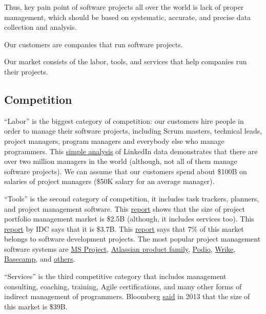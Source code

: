 \documentclass{main}
\begin{document}
Thus, key pain point of software projects all over the world is lack of proper
management, which should be based on systematic, accurate, and precise data
collection and analysis.

Our customers are companies that run software projects.

Our market consists of the labor, tools, and services that help companies run
their projects.

\subsection{Competition}

``Labor'' is the biggest category of competition: our customers hire people  in
order to manage their software projects, including Scrum masters, technical
leads, project managers, program managers and everybody else who manage
programmers. This \href{https://www.binfire.com/blog/2016/06/how-many-project-managers-in-the-world/}{simple analysis}
of LinkedIn data demonstrates that there are
over two million managers in the world (although, not all of them manage
software projects). We can assume that our customers spend about \$100B on
salaries of project managers (\$50K salary for an average manager).

``Tools'' is the second category of competition, it includes task trackers,
pla\-n\-ners, and project management software. This
\href{http://www.marketsandmarkets.com/Market-Reports/project-portfolio-management-software-market-225932595.html}{report}
shows that the size of
project portfolio management market is \$2.5B (although, it includes services
too). This \href{http://www.idc.com/getdoc.jsp?containerId=256779}{report}
by IDC says that it is \$3.7B. This
\href{https://www.capterra.com/project-management-software/user-research/}{report} says that 7\% of this
market belongs to software development projects. The most popular project
management software systems are
\href{https://products.office.com/en-us/project/project-and-portfolio-management-software}{MS Project},
\href{https://www.atlassian.com/software}{Atlassian product family},
\href{https://podio.com/site/en}{Podio},
\href{https://www.wrike.com/}{Wrike},
\href{https://basecamp.com/}{Basecamp}, and
\href{https://www.capterra.com/project-management-software/#infographic}{others}.

``Services'' is the third competitive category that includes management
consulting, coaching, training, Agile certifications, and many other forms of
indirect management of programmers. Bloomberg
\href{http://www.bloomberg.com/news/articles/2013-06-13/where-the-growth-is-in-management-consulting}{said}
in 2013 that the size of this
market is \$39B.
\end{document}
